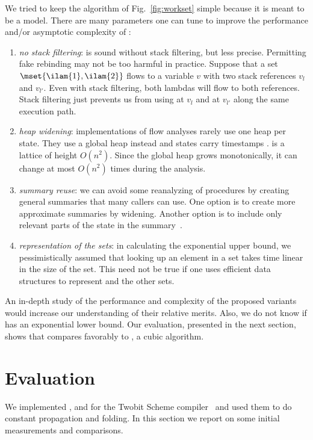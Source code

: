 \documentclass{LMCS}
\theoremstyle{definition} \newtheorem{property}[thm]{Property}
\begin{document}
We tried to keep the algorithm of Fig.~\ref{fig:workset} simple because it is
meant to be a model.
There are many parameters one can tune to improve the performance and/or 
asymptotic complexity of \cfat:
\begin{enumerate}[$\bullet$]
\item 
  \emph{no stack filtering}: 
  \cfat{} is sound without stack filtering, but less precise.
  Permitting fake rebinding may not be too harmful in practice.
  Suppose that a set $\mset{\ilam{1}, \ilam{2}}$ flows to a variable $v$ with 
  two stack references $v_{l}$ and $v_{l'}$.
  Even with stack filtering, both lambdas will flow to both references.
  Stack filtering just prevents us from using  at $v_{l}$ and  
  at $v_{l'}$ along the same execution path.
\item
  \emph{heap widening}: 
  implementations of flow analyses rarely use one heap per state. 
  They use a global heap instead and states carry timestamps 
  \cite[ch.\ 5]{diss/cmu/91/olin}.
  \dheap{} is a lattice of height $O(n^2)$.
  Since the global heap grows monotonically, it can change at most $O(n^2)$
  times during the analysis.
\item
  \emph{summary reuse}: we can avoid some reanalyzing of procedures by 
  creating general summaries that many callers can use. 
  One option is to create more approximate summaries by widening.
  Another option is to include only relevant parts of the state in the 
  summary~\cite{conf/pldi/09/chandra/snugglebug}.
\item
  \emph{representation of the sets}: in calculating the exponential upper 
  bound, we pessimistically assumed that looking up an element in a set takes
  time linear in the size of the set. 
  This need not be true if one uses efficient data structures to represent
  \seen{} and the other sets.
\end{enumerate}
An in-depth study of the performance and complexity of the proposed variants 
would increase our understanding of their relative merits.
Also, we do not know if \cfat{} has an exponential lower bound.
Our evaluation, presented in the next section, shows that \cfat{} compares 
favorably to , a cubic algorithm.


\section{Evaluation\label{sec:evaluation}}

\noindent We implemented \cfat,  and  for the Twobit Scheme
compiler~\cite{conf/lfp/94/clinger/larceny}
and used them to do constant propagation and folding.
In this section we report on some initial measurements and comparisons.
\end{document}
